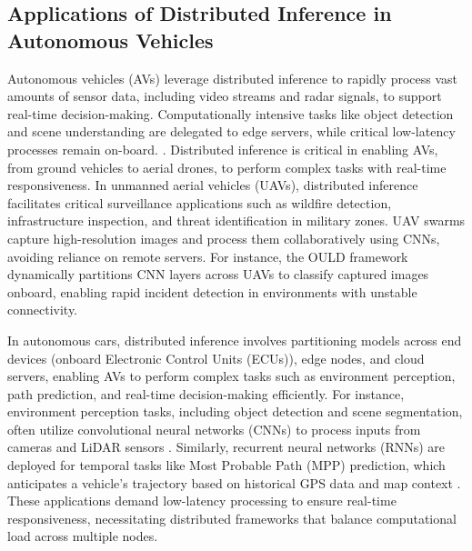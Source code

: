 \documentclass[conference]{IEEEtran}
\begin{document}

\subsection{Applications of Distributed Inference in Autonomous Vehicles}

Autonomous vehicles (AVs) leverage distributed inference to rapidly process vast amounts of sensor data, including video streams and radar signals, to support real-time decision-making. Computationally intensive tasks like object detection and scene understanding are delegated to edge servers, while critical low-latency processes remain on-board. \cite{mohammed2020distributed}. Distributed inference is critical in enabling AVs, from ground vehicles to aerial drones, to perform complex tasks with real-time responsiveness. In unmanned aerial vehicles (UAVs), distributed inference facilitates critical surveillance applications such as wildfire detection, infrastructure inspection, and threat identification in military zones. UAV swarms capture high-resolution images and process them collaboratively using CNNs, avoiding reliance on remote servers. For instance, the OULD framework \cite{jouhari2021distributed} dynamically partitions CNN layers across UAVs to classify captured images onboard, enabling rapid incident detection in environments with unstable connectivity. 

In autonomous cars, distributed inference involves partitioning models across end devices (onboard Electronic Control Units (ECUs)), edge nodes, and cloud servers, enabling AVs to perform complex tasks such as environment perception, path prediction, and real-time decision-making efficiently. For instance, environment perception tasks, including object detection and scene segmentation, often utilize convolutional neural networks (CNNs) to process inputs from cameras and LiDAR sensors \cite{mohammed2020distributed}. Similarly, recurrent neural networks (RNNs) are deployed for temporal tasks like Most Probable Path (MPP) prediction, which anticipates a vehicle’s trajectory based on historical GPS data and map context \cite{grigorescu2020cloud2edge}. These applications demand low-latency processing to ensure real-time responsiveness, necessitating distributed frameworks that balance computational load across multiple nodes.
\end{document}
